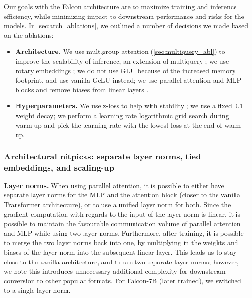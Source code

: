 \documentclass{article}
\begin{document}
Our goals with the Falcon architecture are to maximize training and inference efficiency, while minimizing impact to downstream performance and risks for the models. In \cref{sec:arch_ablations}, we outlined a number of decisions we made based on the ablations:
\vspace{-0.1in}
\begin{itemize}
    \item \textbf{Architecture.} We use multigroup attention (\cref{sec:multiquery_abl}) to improve the scalability of inference, an extension of multiquery \citep{multiquery}; we use rotary embeddings \citep{su2021roformer}; we do not use GLU \citep{shazeer2020glu} because of the increased memory footprint, and use vanilla GeLU instead; we use parallel attention and MLP blocks \citep{gpt-j} and remove biases from linear layers \citep{palm}. 
    \item \textbf{Hyperparameters.} We use z-loss to help with stability \citep{meshtf}; we use a fixed 0.1 weight decay; we perform a learning rate logarithmic grid search during warm-up and pick the learning rate with the lowest loss at the end of warm-up.
\end{itemize}

\subsubsection{Architectural nitpicks: separate layer norms, tied embeddings, and scaling-up}

\textbf{Layer norms.} When using parallel attention, it is possible to either have separate layer norms for the MLP and the attention block (closer to the vanilla Transformer architecture), or to use a unified layer norm for both. Since the gradient computation with regards to the input of the layer norm is linear, it is possible to maintain the favourable communication volume of parallel attention and MLP while using two layer norms. Furthermore, after training, it is possible to merge the two layer norms back into one, by multiplying in the weights and biases of the layer norm into the subsequent linear layer. This leads us to stay close to the vanilla architecture, and to use two separate layer norms; however, we note this introduces unnecessary additional complexity for downstream conversion to other popular formats. For Falcon-7B (later trained), we switched to a single layer norm. 
\end{document}
